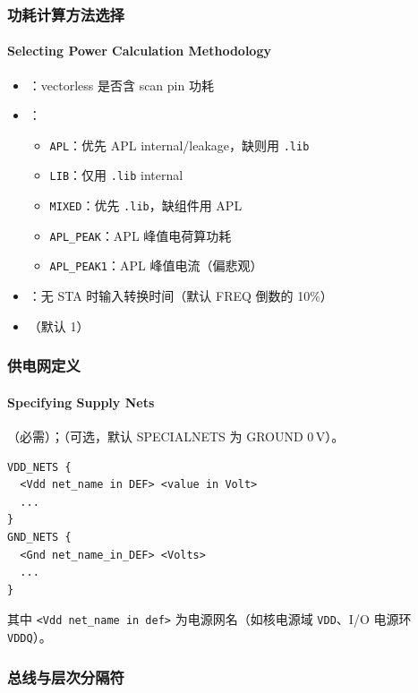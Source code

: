 \subsubsection{功耗计算方法选择}
\paragraph*{Selecting Power Calculation Methodology}

\begin{itemize}
  \item {}：vectorless 是否含 scan pin 功耗
  \item {}：
    \begin{itemize}
      \item \texttt{APL}：优先 APL internal/leakage，缺则用 \texttt{.lib}
      \item \texttt{LIB}：仅用 \texttt{.lib} internal
      \item \texttt{MIXED}：优先 \texttt{.lib}，缺组件用 APL
      \item \texttt{APL\_PEAK}：APL 峰值电荷算功耗
      \item \texttt{APL\_PEAK1}：APL 峰值电流（偏悲观）
    \end{itemize}
  \item {}：无 STA 时输入转换时间（默认 FREQ 倒数的 10\%）
  \item {}（默认 1）
\end{itemize}

\subsubsection{供电网定义}
\paragraph*{Specifying Supply Nets}

（必需）；（可选，默认 SPECIALNETS 为 GROUND 0\,V）。
\begin{lstlisting}
VDD_NETS {
  <Vdd net_name in DEF> <value in Volt>
  ...
}
GND_NETS {
  <Gnd net_name_in_DEF> <Volts>
  ...
}
\end{lstlisting}
其中 \texttt{<Vdd net\_name in def>} 为电源网名（如核电源域 \texttt{VDD}、I/O 电源环 \texttt{VDDQ}）。

\subsubsection{总线与层次分隔符}

